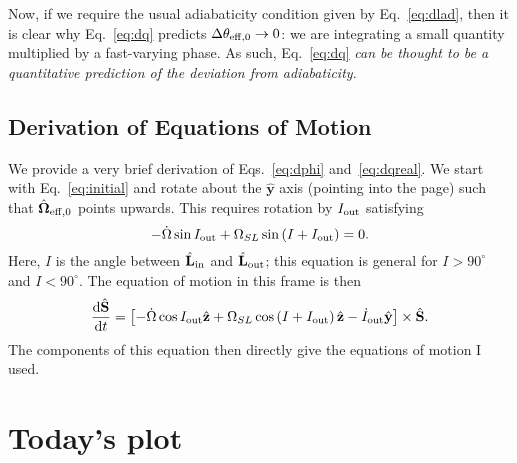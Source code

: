 \documentclass[11pt,
        usenames, %
        dvipsnames %
    ]{article}
\newcommand*{\rd}[2]{\frac{\mathrm{d}#1}{\mathrm{d}#2}}
\newcommand*{\bm}[1]{\boldsymbol{\mathbf{#1}}}
\newcommand*{\uv}[1]{\hat{\bm{#1}}}
\newcommand*{\p}[1]{\left(#1\right)}
\newcommand*{\s}[1]{\left[#1\right]}
\begin{document}
Now, if we require the usual adiabaticity condition given by
Eq.~\eqref{eq:dlad}, then it is clear why Eq.~\eqref{eq:dq} predicts $\Delta
\theta_{\rm eff, 0} \to 0$: we are integrating a small quantity multiplied by a
fast-varying phase. As such, Eq.~\eqref{eq:dq} \emph{can be thought to be a
quantitative prediction of the deviation from adiabaticity.}

\subsection{Derivation of Equations of Motion}

We provide a very brief derivation of Eqs.~\eqref{eq:dphi}
and~\eqref{eq:dqreal}. We start with Eq.~\eqref{eq:initial} and rotate about the
$\uv{y}$ axis (pointing into the page) such that $\uv{\Omega}_{\rm eff,0}$
points upwards. This requires rotation by $I_{\rm out}$ satisfying
\begin{equation}
    -\dot{\Omega} \sin I_{\rm out} + \Omega_{SL}\sin \p{I + I_{\rm out}}
        = 0.\label{eq:I_out_def}
\end{equation}
Here, $I$ is the angle between $\uv{L}_{\rm in}$ and $\uv{L}_{\rm out}$; this
equation is general for $I > 90^\circ$ and $I < 90^\circ$. The equation of
motion in this frame is then
\begin{equation}
    \rd{\uv{S}}{t} = \s{-\dot{\Omega} \cos I_{\rm out}\uv{z} + \Omega_{SL}
        \cos \p{I + I_{\rm out}}\uv{z} - \dot{I}_{\rm out}\uv{y}} \times
        \uv{S}.\label{eq:shat_eom}
\end{equation}
The components of this equation then directly give the equations of motion I
used.

\section{Today's plot}\label{s:today}
\end{document}
